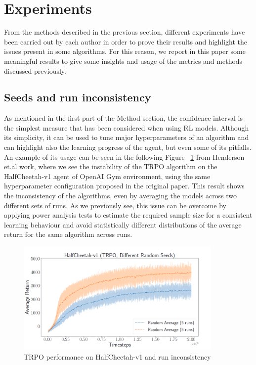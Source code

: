 \documentclass{article}
\begin{document}
\section{Experiments}
From the methods described in the previous section, different experiments have been carried out by each author in order to prove their results and highlight the issues present in some algorithms. For this reason, we report in this paper some meaningful results to give some insights and usage of the metrics and methods discussed previously.
\subsection{Seeds and run inconsistency}
As mentioned in the first part of the Method section, the confidence interval is the simplest measure that has been considered when using RL models. Although its simplicity, it can be used to tune major hyperparameters of an algorithm and can highlight also the learning progress of the agent, but even some of its pitfalls. An example of its usage can be seen in the following Figure ~\ref{fig:sample_size} from Henderson et.al work, where we see the instability of the TRPO \cite{TRPO} algorithm on the HalfCheetah-v1 agent of OpenAI Gym environment, using the same hyperparameter configuration proposed in the original paper. This result shows the inconsistency of the algorithms, even by averaging the models across two different sets of runs. As we previously see, this issue can be overcome by applying power analysis tests to estimate the required sample size for a consistent learning behaviour and avoid statistically different distributions of the average return for the same algorithm across runs.
\begin{figure}[!]
	\centering
	\includegraphics[width=10cm, height=4.cm]{./images/sample_size_dist.png}
	\caption{TRPO performance on HalfCheetah-v1 and run inconsistency~\cite{DRL01}}
	\label{fig:sample_size}
\end{figure}
\end{document}
